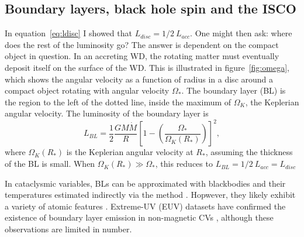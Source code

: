 \subsection{Boundary layers, black hole spin and the ISCO}

In equation~\ref{eq:ldisc} I showed that $L_{disc} = 1/2~L_{acc}$. 
One might then ask: where does the rest of the luminosity go?
The answer is dependent on the compact object in question. 
In an accreting WD, the rotating matter must eventually deposit itself 
on the surface of the WD. This is illustrated in figure~\ref{fig:omega},
which shows the angular velocity as a function of radius in a disc around
a compact object rotating with angular velocity $\Omega_*$. The boundary layer (BL)
is the region to the left of the dotted line, inside the maximum of $\Omega_K$, the Keplerian
angular velocity. The luminosity of the boundary layer is \citep{fkrbook}
\begin{equation}
L_{BL} = \frac{1}{2}\frac{GM \dot{M}}{R} \left[1 - \left(\frac{\Omega_*}{\Omega_K(R_*)}\right)\right]^2,
\end{equation}
where $\Omega_K(R_*)$ is the Keplerian angular velocity at $R_*$, assuming the thickness
of the BL is small. When $\Omega_K(R_*) \gg {\Omega_*}$, this reduces to 
$L_{BL} = 1/2~L_{acc} = L_{disc}$

In cataclysmic variables, 
BLs can be approximated with blackbodies and their temperatures estimated
indirectly via the \cite{zanstra1929} method \cite[e.g.][]{hoare1991,hoaredrew1993}.
Hopwever, they likely exhibit a variety of atomic features \citep{suleimanov2014}.
Extreme-UV (EUV) datasets have confirmed the existence of boundary layer emission
in non-magnetic CVs \citep{mauche1996}, although these observations
are limited in number.

